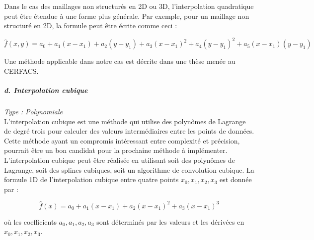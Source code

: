 Dans le cas des maillages non structurés en 2D ou 3D, l'interpolation quadratique peut être étendue à une forme plus générale. Par exemple, pour un maillage non structuré en 2D, la formule peut être écrite comme ceci :

\vspace{-0,5 cm}

\begin{equation}
    \hat{f}(x, y) = a_0 + a_1(x - x_1) + a_2(y - y_1) + a_3(x - x_1)^2 + a_4(y - y_1)^2 + a_5(x - x_1)(y - y_1)
\end{equation}

Une méthode applicable dans notre cas est décrite dans une thèse menée au CERFACS\cite{alexis}.


\subparagraph{d. Interpolation cubique \cite{tanaka}}
\textit{Type : Polynomiale} \\
\phantom{----}L'interpolation cubique est une méthode qui utilise des polynômes de Lagrange de degré trois pour calculer des valeurs intermédiaires entre les points de données. Cette méthode ayant un compromis intéressant entre complexité et précision, pourrait être un bon candidat pour la prochaine méthode à implémenter. L'interpolation cubique peut être réalisée en utilisant soit des polynômes de Lagrange, soit des splines cubiques, soit un algorithme de convolution cubique.
La formule 1D de l'interpolation cubique entre quatre points \( x_0, x_1, x_2, x_3 \) est donnée par :

\vspace{-0,5 cm}

\begin{equation}
    \hat{f}(x) = a_0 + a_1(x - x_1) + a_2(x - x_1)^2 + a_3(x - x_1)^3
\end{equation}

où les coefficients \( a_0, a_1, a_2, a_3 \) sont déterminés par les valeurs et les dérivées en \( x_0, x_1, x_2, x_3 \).


